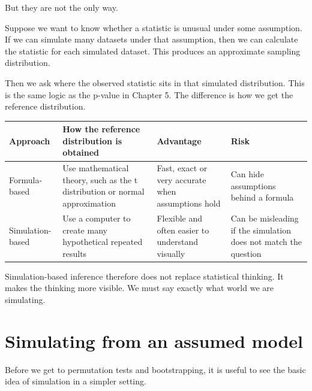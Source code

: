 \documentclass[
  letterpaper,
  DIV=11,
  numbers=noendperiod]{scrreprt}
\begin{document}
But they are not the only way.

Suppose we want to know whether a statistic is unusual under some
assumption. If we can simulate many datasets under that assumption, then
we can calculate the statistic for each simulated dataset. This produces
an approximate sampling distribution.

Then we ask where the observed statistic sits in that simulated
distribution. This is the same logic as the p-value in Chapter 5. The
difference is how we get the reference distribution.

\begin{table}
\fontsize{12.0pt}{14.0pt}\selectfont
\begin{tabular*}{1\linewidth}{@{\extracolsep{\fill}}llll}
\toprule
Approach & How the reference distribution is obtained & Advantage & Risk \\ 
\midrule\addlinespace[2.5pt]
Formula-based & Use mathematical theory, such as the t distribution or normal approximation & Fast, exact or very accurate when assumptions hold & Can hide assumptions behind a formula \\ 
Simulation-based & Use a computer to create many hypothetical repeated results & Flexible and often easier to understand visually & Can be misleading if the simulation does not match the question \\ 
\bottomrule
\end{tabular*}
\end{table}

Simulation-based inference therefore does not replace statistical
thinking. It makes the thinking more visible. We must say exactly what
world we are simulating.

\section{Simulating from an assumed
model}\label{simulating-from-an-assumed-model}

Before we get to permutation tests and bootstrapping, it is useful to
see the basic idea of simulation in a simpler setting.
\end{document}
